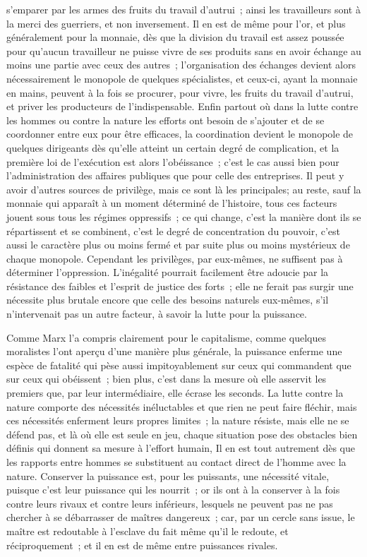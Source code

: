 \documentclass[french,twoside]{book} %
\begin{document}
s'emparer par les armes des fruits du travail d'autrui ; ainsi les travailleurs sont à la merci des guerriers, et non inversement. Il en est de même pour l'or, et plus généralement pour la monnaie, dès que la division du travail est assez poussée pour qu'aucun travailleur ne puisse vivre de ses produits sans en avoir échange au moins une partie avec ceux des autres ; l'organisation des échanges devient alors nécessairement le monopole de quelques spécialistes, et ceux-ci, ayant la monnaie en mains, peuvent à la fois se procurer, pour vivre, les fruits du travail d'autrui, et priver les producteurs de l'indispensable. Enfin partout où dans la lutte contre les hommes ou contre la nature les efforts ont besoin de s'ajouter et de se coordonner entre eux pour être efficaces, la coordination devient le monopole de quelques dirigeants dès qu'elle atteint un certain degré de complication, et la première loi de l'exécution est alors l'obéissance ; c'est le cas aussi bien pour l'administration des affaires publiques que pour celle des entreprises. Il peut y avoir d'autres sources de privilège, mais ce sont là les principales; au reste, sauf la monnaie qui apparaît à un moment déterminé de l'histoire, tous ces facteurs jouent sous tous les régimes oppressifs ; ce qui change, c'est la manière dont ils se répartissent et se combinent, c'est le degré de concentration du pouvoir, c'est aussi le caractère plus ou moins fermé et par suite plus ou moins mystérieux de chaque monopole. Cependant les privilèges, par eux-mêmes, ne suffisent pas à déterminer l'oppression. L'inégalité pourrait facilement être adoucie par la résistance des faibles et l'esprit de justice des forts ; elle ne ferait pas surgir une nécessite plus brutale encore que celle des besoins naturels eux-mêmes, s'il n'intervenait pas un autre facteur, à savoir la lutte pour la puissance.\par
Comme Marx l'a compris clairement pour le capitalisme, comme quelques moralistes l'ont aperçu d'une manière plus générale, la puissance enferme une espèce de fatalité qui pèse aussi impitoyablement sur ceux qui commandent que sur ceux qui obéissent ; bien plus, c'est dans la mesure où elle asservit les premiers que, par leur intermédiaire, elle écrase les seconds. La lutte contre la nature comporte des nécessités inéluctables et que rien ne peut faire fléchir, mais ces nécessités enferment leurs propres limites ; la nature résiste, mais elle ne se défend pas, et là où elle est seule en jeu, chaque situation pose des obstacles bien définis qui donnent sa mesure à l'effort humain, Il en est tout autrement dès que les rapports entre hommes se substituent au contact direct de l'homme avec la nature. Conserver la puissance est, pour les puissants, une nécessité vitale, puisque c'est leur puissance qui les nourrit ; or ils ont à la conserver à la fois contre leurs rivaux et contre leurs inférieurs, lesquels ne peuvent pas ne pas chercher à se débarrasser de maîtres dangereux ; car, par un cercle sans issue, le maître est redoutable à l'esclave du fait même qu'il le redoute, et réciproquement ; et il en est de même entre puissances rivales.\par
\end{document}
